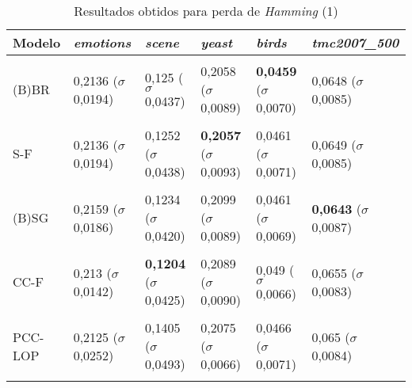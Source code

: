 
\begin{table}[htbp]
	\centering
	\caption{Resultados obtidos para perda de \textit{{Hamming}} (1)}
		\begin{tabular}
        { p{0.88in} p{0.88in} p{0.88in} p{0.88in} p{0.88in} p{0.88in} }
        
        \hline
Modelo & \textit{emotions} & \textit{scene} & \textit{yeast} & \textit{birds} & \textit{tmc2007\_500} \\ 
\hline \\

(B)BR & 0,2136 \newline ($\sigma$ 0,0194) & 0,125 \newline ($\sigma$ 0,0437) & 0,2058 \newline ($\sigma$ 0,0089) & \textbf{0,0459} \newline ($\sigma$ 0,0070) & 0,0648 \newline ($\sigma$ 0,0085) \\ \\
S-F & 0,2136 \newline ($\sigma$ 0,0194) & 0,1252 \newline ($\sigma$ 0,0438) & \textbf{0,2057} \newline ($\sigma$ 0,0093) & 0,0461 \newline ($\sigma$ 0,0071) & 0,0649 \newline ($\sigma$ 0,0085) \\ \\
(B)SG & 0,2159 \newline ($\sigma$ 0,0186) & 0,1234 \newline ($\sigma$ 0,0420) & 0,2099 \newline ($\sigma$ 0,0089) & 0,0461 \newline ($\sigma$ 0,0069) & \textbf{0,0643} \newline ($\sigma$ 0,0087) \\ \\
CC-F & 0,213 \newline ($\sigma$ 0,0142) & \textbf{0,1204} \newline ($\sigma$ 0,0425) & 0,2089 \newline ($\sigma$ 0,0090) & 0,049 \newline ($\sigma$ 0,0066) & 0,0655 \newline ($\sigma$ 0,0083) \\ \\
PCC-LOP & 0,2125 \newline ($\sigma$ 0,0252) & 0,1405 \newline ($\sigma$ 0,0493) & 0,2075 \newline ($\sigma$ 0,0066) & 0,0466 \newline ($\sigma$ 0,0071) & 0,065 \newline ($\sigma$ 0,0084) \\ \\

\end{tabular}
\end{table}
